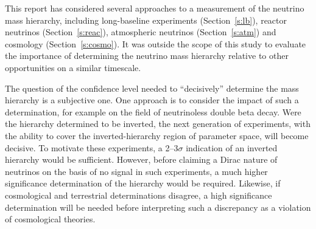 This report has considered several approaches to a measurement of the neutrino mass hierarchy, including long-baseline experiments (Section~\ref{s:lb}), reactor neutrinos (Section~\ref{s:reac}), atmospheric neutrinos (Section~\ref{s:atm}) and cosmology (Section~\ref{s:cosmo}).
It was outside the scope of this study to evaluate the importance of determining the neutrino mass hierarchy relative to other opportunities on a similar timescale. %


The question of the confidence level needed to ``decisively'' determine the mass hierarchy is a subjective one.  One approach is to consider the impact of such a determination, for example on the field of neutrinoless double beta decay.  Were the hierarchy determined to be inverted, the next generation of experiments, with the ability to cover the inverted-hierarchy region of parameter space, will become decisive.  To motivate these experiments, a 2--3$\sigma$ indication of an inverted hierarchy would be sufficient.  However, before claiming a Dirac nature of neutrinos on the basis of no signal in such experiments, a much higher significance determination of the hierarchy would be required.  Likewise, if cosmological and terrestrial determinations disagree, a high significance determination will be needed before interpreting such a discrepancy as a violation of cosmological theories.

